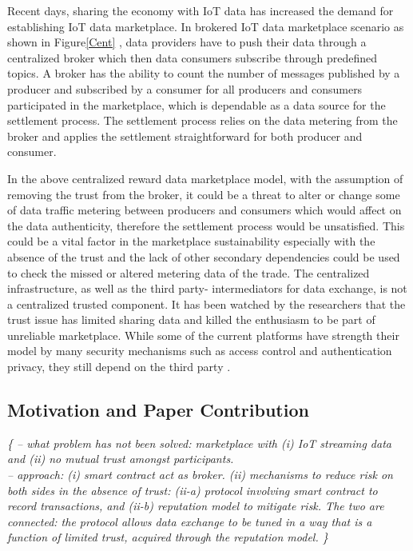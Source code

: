 \documentclass[letterpaper, 10 pt, conference]{ieeeconf}  %
\newcommand{\anote}[1]{{\leavevmode\smaller\itshape\color{red}\{#1\}}}
\begin{document}
Recent days, sharing the economy with IoT data has increased the demand for establishing IoT data marketplace. In brokered IoT data marketplace scenario as shown in Figure\ref{Cent} , data providers have to push their data through a centralized broker which then data consumers subscribe through predefined topics. A broker has the ability to count the number of messages published by a producer and subscribed by a consumer for all producers and consumers participated in the marketplace, which is dependable as a data source for the settlement process. The settlement process relies on the data metering from the broker and applies the settlement straightforward for both producer and consumer. 
	
In the above centralized reward data marketplace model, with the assumption of removing the trust from the broker, it could be a threat to alter or change some of data traffic metering between producers and consumers which would affect on the data authenticity, therefore the settlement process would be unsatisfied. This could be a vital factor in the marketplace sustainability especially with the absence of the trust and the lack of other secondary dependencies could be used to check the missed or altered metering data of the trade.
The centralized infrastructure, as well as the third party- intermediators for data exchange, is not a centralized trusted component. It has been watched by the researchers that the trust issue has limited sharing data and killed the enthusiasm to be part of unreliable marketplace. While some of the current platforms have strength their model by many security mechanisms such as access control and authentication privacy, they still depend on the third party \cite{12}.

\subsection{Motivation and Paper Contribution} \label{Motivation&Contribution}

\anote{
-- what problem has not been solved: marketplace with (i) IoT streaming data and (ii) no mutual trust amongst participants. \\
-- approach: (i) smart contract act as broker. (ii) mechanisms to reduce risk on both sides in the absence of trust: (ii-a) protocol involving smart contract to record transactions, and (ii-b) reputation model to mitigate risk. The two are connected: the protocol allows data exchange to be tuned in a way that is a function of limited trust, acquired through the reputation model.
}
\end{document}
